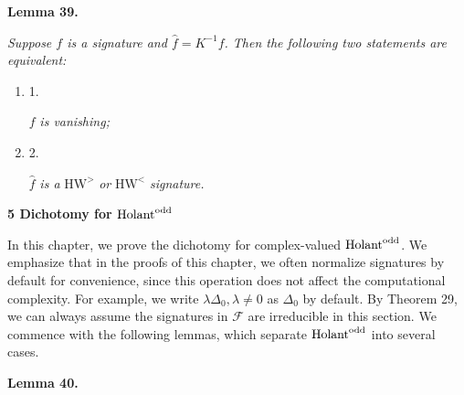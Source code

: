 \documentclass[10pt,a4paper]{article}
\begin{document}


\par\medskip\noindent\textbf{
\textbf{Lemma 39}\textbf{.}
}\par



\emph{Suppose $f$ is a signature and $\widehat{f}=K^{-1}f$. Then the following two statements are equivalent:}\par


\begin{enumerate}


\item[] 
1. 


$f$\emph{ is vanishing;}\par





\item[] 
2. 


$\widehat{f}$\emph{ is a }$\text{HW}^{>}$\emph{ or }$\text{HW}^{<}$\emph{ signature.}\par





\end{enumerate}







\par\medskip\noindent\textbf{
5 Dichotomy for $\textup{{Holant}}^{\text{odd}}$
}\par




In this chapter, we prove the dichotomy for complex-valued $\textup{{Holant}}^{\text{odd}}$. We emphasize that in the proofs of this chapter, we often normalize signatures by default for convenience, since this operation does not affect the computational complexity. For example, we write $\lambda\Delta_{0},\lambda\neq 0$ as $\Delta_{0}$ by default.
By Theorem 29, we can always assume the signatures in $\mathcal{F}$ are irreducible in this section. We commence with the following lemmas, which separate $\textup{{Holant}}^{\text{odd}}$ into several cases.\par





\par\medskip\noindent\textbf{
\textbf{Lemma 40}\textbf{.}
}\par
\end{document}
